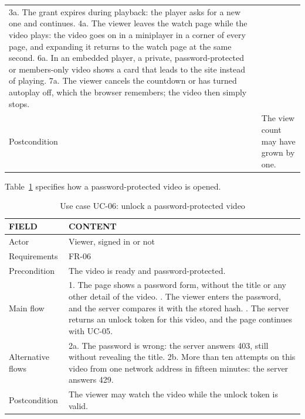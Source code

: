 \begin{table}[H]
\begin{tabularx}{\textwidth}{p{} X}
  3a. The grant expires during playback: the player asks for a new one and continues. \newline
  4a. The viewer leaves the watch page while the video plays: the video goes on in a miniplayer in a corner of every page, and expanding it returns to the watch page at the same second. \newline
  6a. In an embedded player, a private, password-protected or members-only video shows a card that leads to the site instead of playing. \newline
  7a. The viewer cancels the countdown or has turned autoplay off, which the browser remembers; the video then simply stops. \\
Postcondition & The view count may have grown by one. \\
\bottomrule
\end{tabularx}
\end{table}

Table~\ref{tab:uc-unlock} specifies how a password-protected video is opened.

\begin{table}[H]
\centering
\caption{Use case UC-06: unlock a password-protected video}
\label{tab:uc-unlock}
\small
\begin{tabularx}{\textwidth}{p{} X}
\toprule
\textbf{FIELD} & \textbf{CONTENT} \\
\midrule
Actor & Viewer, signed in or not \\
Requirements & FR-06 \\
Precondition & The video is ready and password-protected. \\
Main flow &
  1. The page shows a password form, without the title or any other detail of the video. \newline
  2. The viewer enters the password, and the server compares it with the stored hash. \newline
  3. The server returns an unlock token for this video, and the page continues with UC-05. \\
Alternative flows &
  2a. The password is wrong: the server answers 403, still without revealing the title. \newline
  2b. More than ten attempts on this video from one network address in fifteen minutes: the server answers 429. \\
Postcondition & The viewer may watch the video while the unlock token is valid. \\
\bottomrule
\end{tabularx}
\end{table}

